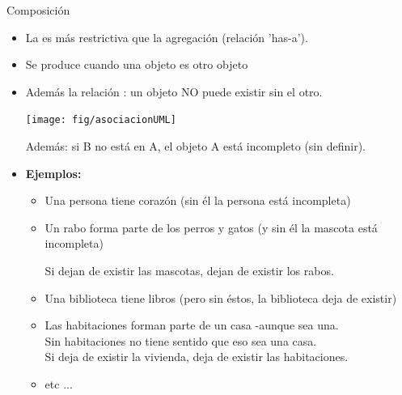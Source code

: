 \documentclass[10pt,envcountsect,spanish]{beamer}
\begin{document}
\begin{frame}{Composición} 

\begin{itemize}\setlength{\itemsep}{0cm}
\item La  es más restrictiva que la agregación (relación 'has-a').

\item Se produce cuando una objeto es  otro objeto 

\item Además la relación : un objeto NO puede existir sin el otro.


\centerline{\texttt{[image: fig/asociacionUML]}}

\centerline{}
\centerline{\footnotesize Además: si B no está en A, el objeto A está incompleto (sin definir).}


\item \textbf{Ejemplos:} \it \small
\begin{itemize}
\item Una persona tiene corazón  (sin él la persona está incompleta)

\item Un rabo forma parte de los perros y  gatos (y sin él la mascota está incompleta)

Si dejan de existir las mascotas, dejan de existir los rabos.

\item Una biblioteca tiene libros (pero sin éstos, la biblioteca deja de existir)

\item Las habitaciones forman parte de un casa -aunque sea una.\\
Sin habitaciones no tiene sentido que eso sea una casa.\\
Si deja de existir la vivienda, deja de existir las habitaciones.

\item etc ...
\end{itemize}

\end{itemize}


\end{frame}
\end{document}
